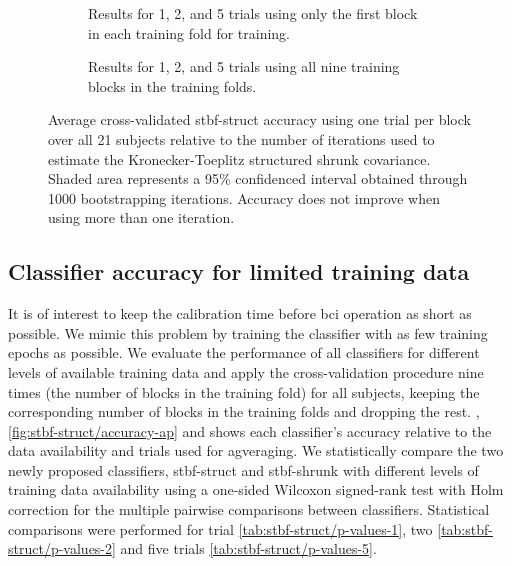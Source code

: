   \begin{figure}[t]
    \begin{subfigure}{\linewidth}
      
      \caption{Results for 1, 2, and 5 trials using only the first block in each
      training fold for training.}
    \end{subfigure}
    \smallskip

    \begin{subfigure}{\linewidth}
      
      \caption{Results for 1, 2, and 5 trials using all nine training blocks in
      the training folds.}
    \end{subfigure}
    \caption[Average cross-validated \acs{stbf-struct} accuracy]{%
      Average cross-validated \ac{stbf-struct} accuracy using
			one trial per block over all 21 subjects
			relative to the number of iterations used to estimate the Kronecker-Toeplitz structured shrunk
			covariance. Shaded area represents a 95\% confidenced interval obtained
      through 1000 bootstrapping iterations.
      Accuracy does not improve when using more than one iteration.}
		\label{fig:iterations}
	\end{figure}

	\subsection{Classifier accuracy for limited training data}
	It is of interest to keep the calibration time before \ac{bci}
	operation as short as possible.
	We mimic this problem by training the classifier with as few training epochs as possible.
	We evaluate the performance of all classifiers for different levels of
	available training data and apply the cross-validation procedure nine times (the number of blocks in the training fold) for all subjects, keeping the
	corresponding number of blocks in the training folds and dropping the rest.
  , \cref{fig:stbf-struct/accuracy-ap} and
  shows each classifier's accuracy relative to the data availability and trials
  used for agveraging.
	We statistically compare the two newly proposed classifiers,
	\ac{stbf-struct} and \ac{stbf-shrunk} with different levels of training
	data availability using a one-sided Wilcoxon signed-rank test with Holm correction for the multiple pairwise comparisons between classifiers.
	Statistical comparisons were performed for trial
  \cref{tab:stbf-struct/p-values-1}, two \cref{tab:stbf-struct/p-values-2}
  and five trials \cref{tab:stbf-struct/p-values-5}.

